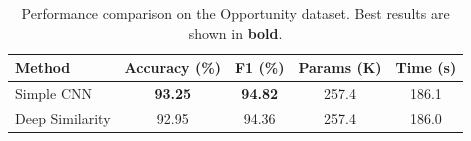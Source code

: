 \begin{table}[htbp]
\centering
\caption{Performance comparison on the Opportunity dataset. Best results are shown in \textbf{bold}.}
\label{tab:opportunity_results}
\begin{tabular}{lcccc}
\toprule
\textbf{Method} & \textbf{Accuracy (\%)} & \textbf{F1 (\%)} & \textbf{Params (K)} & \textbf{Time (s)} \\
\midrule
Simple CNN & \textbf{93.25} & \textbf{94.82} & 257.4 & 186.1 \\
Deep Similarity & 92.95 & 94.36 & 257.4 & 186.0 \\
\bottomrule
\end{tabular}
\end{table}
